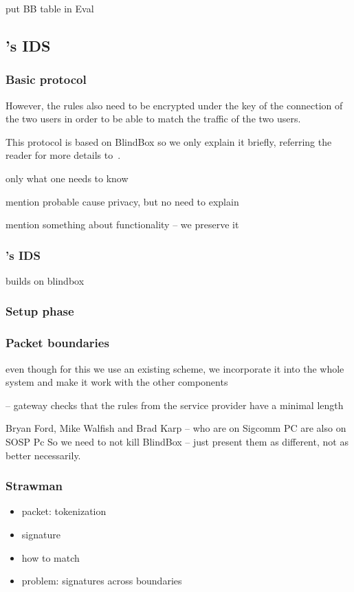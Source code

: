 put BB table in Eval 


\subsection{\sys's IDS}\label{sec:IDS}

\subsubsection{Basic protocol}

However, the rules also need to be encrypted
under the key of the connection of the two users in order to be able to match the 
traffic of the two users. 

This protocol is based on BlindBox so we only explain it briefly, referring the reader for more details to~\cite{blindbox}. 


only what one needs to know

mention probable cause privacy, but no need to explain

mention something about functionality -- we preserve it

\subsubsection{\sys's IDS}


builds on blindbox

\subsubsection{Setup phase}


\subsubsection{Packet boundaries}



even though for this we use an existing scheme, we incorporate it into the whole
system and make it work with the other components

-- gateway checks that the rules from the service provider have a minimal length 

Bryan Ford, Mike Walfish and Brad Karp -- who are on Sigcomm PC are also on SOSP Pc
So we need to not kill BlindBox -- just present them as different, not as better necessarily.


\subsubsection{Strawman}
\begin{itemize}
\item packet: tokenization
\item signature
\item how to match
\item problem: signatures across boundaries
\end{itemize}

